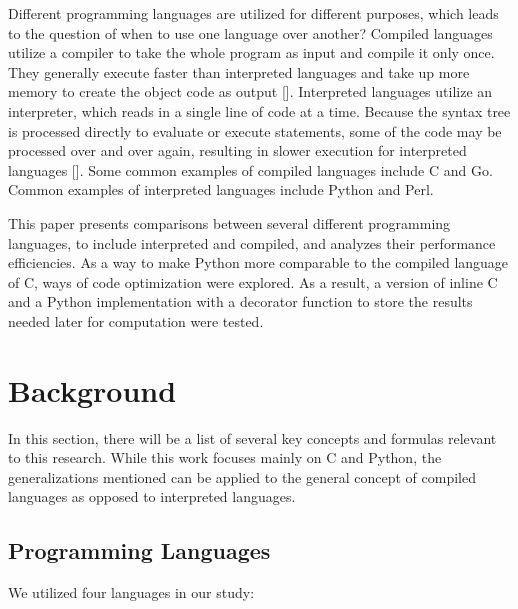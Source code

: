 \documentclass{sig-alternate}
\begin{document}
Different programming languages are utilized for different purposes, which leads to the question of when to use one language over another? Compiled languages utilize a compiler to take the whole program as input and compile it only once. They generally execute faster than interpreted languages and take up more memory to create the object code as output [\cite{languages}]. Interpreted languages utilize an interpreter, which reads in a single line of code at a time. Because the syntax tree is processed directly to evaluate or execute statements, some of the code may be processed over and over again, resulting in slower execution for interpreted languages [\cite{languages}]. Some common examples of compiled languages include C and Go. Common examples of interpreted languages include Python and Perl. 

This paper presents comparisons between several different programming languages, to include interpreted and compiled, and analyzes their performance efficiencies. As a way to make Python more comparable to the compiled language of C, ways of code optimization were explored. As a result, a version of inline C and a Python implementation with a decorator function to store the results needed later for computation were tested.

\section{Background}

In this section, there will be a list of several key concepts and formulas relevant to this research. While this work focuses mainly on C and Python, the generalizations mentioned can be applied to the general concept of compiled languages as opposed to interpreted languages. 

\subsection{Programming Languages}	

We utilized four languages in our study:
\end{document}

